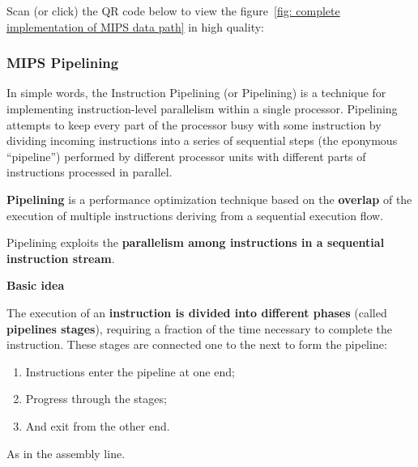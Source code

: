 \documentclass[a4paper]{article}
\newcommand{\dquotes}[1]{``#1''}
\newcommand{\definition}[1]{\textcolor{Red3}{\textbf{#1}}\index{#1}}
\newcommand{\highspace}{\vspace{1.2em}\noindent}
\begin{document}
    \noindent
    Scan (or click) the QR code below to view the figure~\ref{fig: complete implementation of MIPS data path} in high quality:
    \begin{center}
    \end{center}

    \newpage

    \subsubsection{MIPS Pipelining}

    In simple words, the Instruction Pipelining (or Pipelining) is a technique for implementing instruction-level parallelism within a single processor. Pipelining attempts to keep every part of the processor busy with some instruction by dividing incoming instructions into a series of sequential steps (the eponymous \dquotes{pipeline}) performed by different processor units with different parts of instructions processed in parallel.

    \highspace
    \begin{definitionbox}
        \definition{Pipelining} is a performance optimization technique based on the \textbf{overlap} of the execution of multiple instructions deriving from a sequential execution flow.
    \end{definitionbox}

    \noindent
    Pipelining exploits the \textbf{parallelism among instructions in a sequential instruction stream}.

    \begin{flushleft}
        \textcolor{Red2}{ \textbf{Basic idea}}
    \end{flushleft}
    The execution of an \textbf{instruction is divided into different phases} (called \definition{pipelines stages}), requiring a fraction of the time necessary to complete the instruction. These stages are connected one to the next to form the pipeline: 
    \begin{enumerate}
        \item Instructions enter the pipeline at one end;
        \item Progress through the stages;
        \item And exit from the other end.
    \end{enumerate}
    As in the assembly line.
\end{document}
